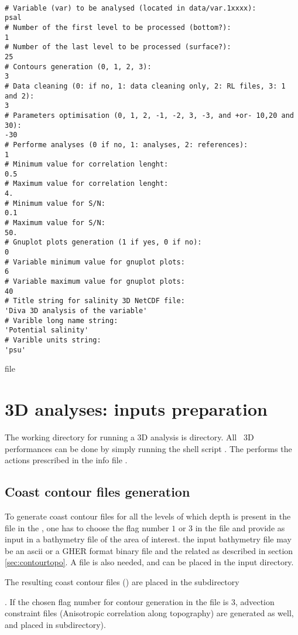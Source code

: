 {\begin{exfile}[H] %
\begin{footnotesize}
\begin{verbatim}

# Variable (var) to be analysed (located in data/var.1xxxx):
psal
# Number of the first level to be processed (bottom?):
1
# Number of the last level to be processed (surface?):
25
# Contours generation (0, 1, 2, 3):
3
# Data cleaning (0: if no, 1: data cleaning only, 2: RL files, 3: 1 and 2):
3
# Parameters optimisation (0, 1, 2, -1, -2, 3, -3, and +or- 10,20 and 30):
-30
# Performe analyses (0 if no, 1: analyses, 2: references):
1
# Minimum value for correlation lenght:
0.5
# Maximum value for correlation lenght:
4.
# Minimum value for S/N:
0.1
# Maximum value for S/N:
50.
# Gnuplot plots generation (1 if yes, 0 if no):
0
# Variable minimum value for gnuplot plots:
6
# Variable maximum value for gnuplot plots:
40
# Title string for salinity 3D NetCDF file:
'Diva 3D analysis of the variable'
# Varible long name string:
'Potential salinity'
# Varible units string:
'psu'
\end{verbatim}
\end{footnotesize}
\caption{ file}
\label{3Dinfotfile}
\end{exfile}

\section{3D analyses: inputs preparation \label{3Dpreproc}}

The working directory for running a 3D \diva analysis is   directory. All \diva\ 3D performances can be done by simply running the shell script . The  performs the actions prescribed in the info file .


\subsection{Coast contour files generation \label{contgeneration}}

To generate coast contour files for all the levels of which depth is present in the  file in the , one has to choose the flag number $1$ or $3$ in the  file and provide as input in  a bathymetry file of the area of interest. the input bathymetry file may be an ascii   or a GHER format binary file   and the related  as described in section \ref{sec:contourtopo}. A  file is also needed, and can be placed in the   input directory.

 The resulting coast contour files () are placed in the subdirectory\linebreak {}}. If the chosen flag number for contour generation in the  file is $3$, advection constraint files (Anisotropic correlation along topography) are generated as well, and placed in  subdirectory).
